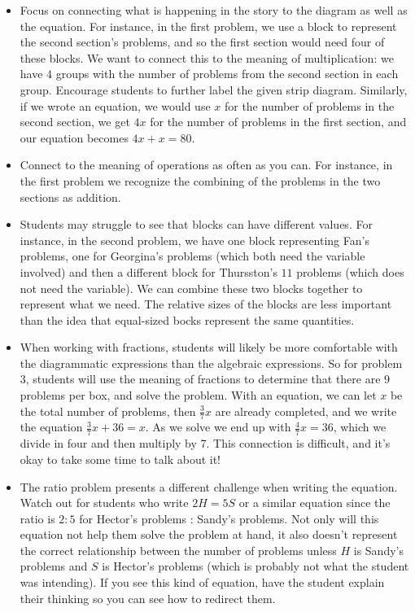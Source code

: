 \documentclass[nooutcomes,noauthor,handout]{ximera}
\begin{document}
\begin{instructorNotes}
\begin{itemize}
	\item Focus on connecting what is happening in the story to the diagram as well as the equation. For instance, in the first problem, we use a block to represent the second section's problems, and so the first section would need four of these blocks. We want to connect this to the meaning of multiplication: we have $4$ groups with the number of problems from the second section in each group. Encourage students to further label the given strip diagram. Similarly, if we wrote an equation, we would use $x$ for the number of problems in the second section, we get $4x$ for the number of problems in the first section, and our equation becomes $4x + x = 80$.
	\item Connect to the meaning of operations as often as you can. For instance, in the first problem we recognize the combining of the problems in the two sections as addition.
	\item Students may struggle to see that blocks can have different values. For instance, in the second problem, we have one block representing Fan's problems, one for Georgina's problems (which both need the variable involved) and then a different block for Thursston's $11$ problems (which does not need the variable). We can combine these two blocks together to represent what we need. The relative sizes of the blocks are less important than the idea that equal-sized bocks represent the same quantities.
	\item When working with fractions, students will likely be more comfortable with the diagrammatic expressions than the algebraic expressions. So for problem 3, students will use the meaning of fractions to determine that there are $9$ problems per box, and solve the problem. With an equation, we can let $x$ be the total number of problems, then $\frac37 x$ are already completed, and we write the equation $\frac37 x + 36 = x$. As we solve we end up with $\frac47 x = 36$, which we divide in four and then multiply by 7. This connection is difficult, and it's okay to take some time to talk about it!
	\item The ratio problem presents a different challenge when writing the equation. Watch out for students who write $2H = 5S$ or a similar equation since the ratio is $2:5$ for Hector's problems : Sandy's problems. Not only will this equation not help them solve the problem at hand, it also doesn't represent the correct relationship between the number of problems unless $H$ is Sandy's problems and $S$ is Hector's problems (which is probably not what the student was intending). If you see this kind of equation, have the student explain their thinking so you can see how to redirect them.
\end{itemize}



\end{instructorNotes}
\end{document}
